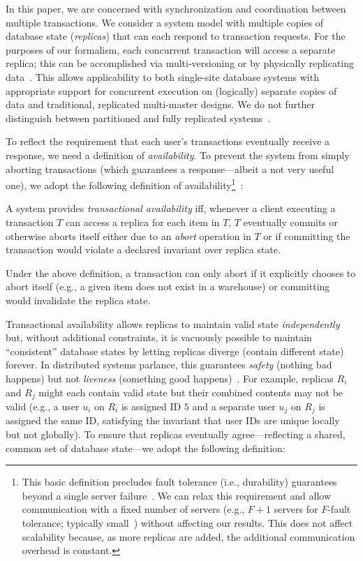  In this paper, we are concerned with
synchronization and coordination between multiple transactions. We
consider a system model with multiple copies of database state
(\textit{replicas}) that can each respond to transaction requests. For
the purposes of our formalism, each concurrent transaction will access
a separate replica; this can be accomplished via multi-versioning or
by physically replicating data~\cite{bernstein-book}. This allows
applicability to both single-site database systems with appropriate
support for concurrent execution on (logically) separate copies of
data and traditional, replicated multi-master designs. We do not
further distinguish between partitioned and fully replicated
systems~\cite{hat-vldb}.

 To reflect the requirement that each user's
transactions eventually receive a response, we need a definition of
\textit{availability}. To prevent the system from simply aborting
transactions (which guarantees a response---albeit a not very useful
one), we adopt the following definition of availability\footnote{This
  basic definition precludes fault tolerance (i.e., durability)
  guarantees beyond a single server failure~\cite{hat-vldb}. We can
  relax this requirement and allow communication with a fixed number
  of servers (e.g., $F+1$ servers for $F$-fault tolerance; typically
  small~\cite{spanner,dynamo,megastore}) without affecting our
  results. This does not affect scalability because, as more replicas
  are added, the additional communication overhead is
  constant.}~\cite{hat-vldb}:

\begin{definition} 
A system provides \textit{transactional availability} iff, whenever a
client executing a transaction $T$ can access a replica for each item
in $T$, $T$ eventually commits or otherwise aborts itself either due
to an \textit{abort} operation in $T$ or if committing the transaction
would violate a declared invariant over replica state.
\end{definition}

Under the above definition, a transaction can only abort if it
explicitly chooses to abort itself (e.g., a given item does not exist
in a warehouse) or committing would invalidate the replica state.

 Transactional availability allows replicas to
maintain valid state \textit{independently} but, without additional
constraints, it is vacuously possible to maintain ``consistent''
database states by letting replicas diverge (contain different state)
forever. In distributed systems parlance, this guarantees
\textit{safety} (nothing bad happens) but not \textit{liveness}
(something good happens)~\cite{schneider-concurrent}. For example,
replicas $R_i$ and $R_j$ might each contain valid state but their
combined contents may not be valid (e.g., a user $u_i$ on $R_i$ is
assigned ID $5$ and a separate user $u_j$ on $R_j$ is assigned the
same ID, satisfying the invariant that user IDs are unique locally but
not globally). To ensure that replicas eventually agree---reflecting a
shared, common set of database state---we adopt the following
definition:

